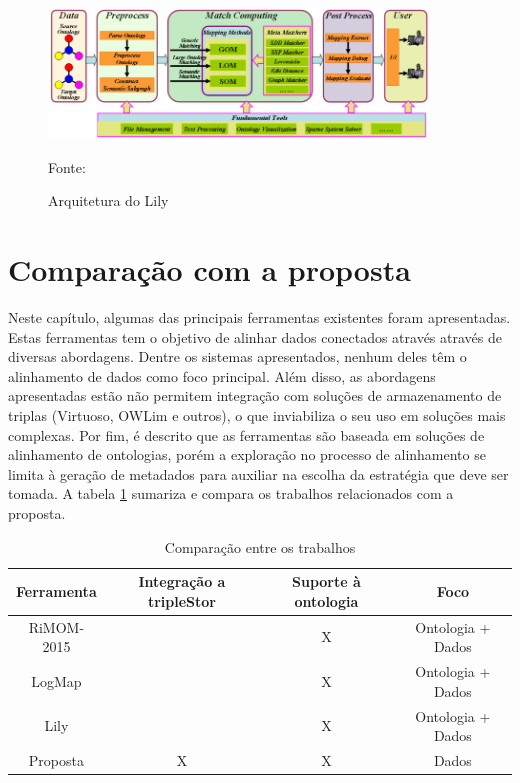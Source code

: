 \begin{figure}[!ht]
	\centering
	\includegraphics[width=0.9\textwidth]{./imagens/lily.png}
    \caption{Arquitetura do Lily}
	\footnotesize{Fonte: \cite{euzenat2013d}}
	\label{fig:lily}
\end{figure}

\section*{Comparação com a proposta}

Neste capítulo, algumas das principais ferramentas existentes foram apresentadas. Estas ferramentas tem o objetivo de alinhar dados conectados através através de diversas abordagens.
Dentre os sistemas apresentados, nenhum deles têm o alinhamento de dados como foco principal. Além disso, as abordagens apresentadas estão não permitem integração com soluções de armazenamento de triplas (Virtuoso, OWLim e outros), o que inviabiliza o seu uso em soluções mais complexas. Por fim, é descrito que as ferramentas são baseada em soluções de alinhamento de ontologias, porém a exploração no processo de alinhamento se limita à geração de metadados para auxiliar na escolha da estratégia que deve ser tomada. A tabela \ref{tab:comparacao} sumariza e compara os trabalhos relacionados com a proposta.

\begin{table}[h]
\centering
\caption{Comparação entre os trabalhos}
\label{tab:comparacao}
\begin{tabular}{@{}cccc@{}}
\toprule
Ferramenta & Integração a tripleStor & Suporte à ontologia & Foco               \\ \midrule
RiMOM-2015 &                         & X                   & Ontologia + Dados \\
LogMap     &                         & X                   & Ontologia + Dados \\
Lily       &                         & X                   & Ontologia + Dados \\
Proposta   & X                       & X                   & Dados             \\ \midrule
\end{tabular}
\end{table}
